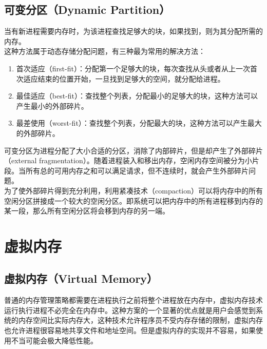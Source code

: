 \subsection{可变分区（Dynamic Partition）}

当有新进程需要内存时，为该进程查找足够大的块，如果找到，则为其分配所需的内存。\\

这种方法属于动态存储分配问题，有三种最为常用的解决方法：

\begin{enumerate}
    \item 首次适应（first-fit）：分配第一个足够大的块，每次查找从头或者从上一次首次适应结束的位置开始，一旦找到足够大的空间，就分配给进程。

    \item 最佳适应（best-fit）：查找整个列表，分配最小的足够大的块，这种方法可以产生最小的外部碎片。

    \item 最差使用（worst-fit）：查找整个列表，分配最大的块，这种方法可以产生最大的外部碎片。
\end{enumerate}

可变分区为进程分配了大小合适的分区，消除了内部碎片，但是却产生了外部碎片（external fragmentation）。随着进程装入和移出内存，空闲内存空间被分为小片段。当所有总的可用内存之和可以满足请求，但不连续时，就会产生外部碎片问题。\\

为了使外部碎片得到充分利用，利用紧凑技术（compaction）可以将内存中的所有空闲分区拼接成一个较大的空闲分区。即系统可以把内存中的所有进程移到内存的某一段，那么所有空闲分区将会移到内存的另一端。

\newpage

\section{虚拟内存}

\subsection{虚拟内存（Virtual Memory）}

普通的内存管理策略都需要在进程执行之前将整个进程放在内存中，虚拟内存技术运行执行进程不必完全在内存中。这种方案的一个显著的优点就是用户会感觉到系统的内存空间比实际内存大，这种技术允许程序员不受内存存储的限制，虚拟内存也允许进程很容易地共享文件和地址空间。但是虚拟内存的实现并不容易，如果使用不当可能会极大降低性能。\\


